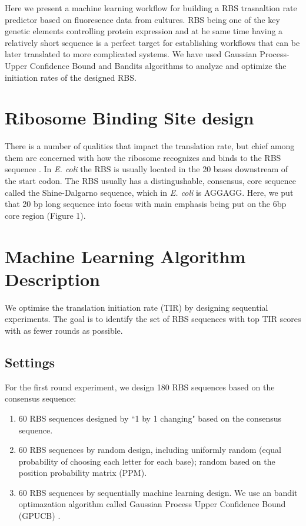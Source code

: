\documentclass{article}
\begin{document}
Here we present a machine learning workflow for building a RBS trasnaltion rate predictor based on fluoresence data from cultures. RBS being one of the key genetic elements controlling protein expression and at he same time having a relatively short sequence is a perfect target for establishing workflows that can be later translated to more complicated systems. We have used Gaussian Process-Upper Confidence Bound and Bandits algorithms to analyze and optimize the initiation rates of the designed RBS.

\section{Ribosome Binding Site design}
There is a number of qualities that impact the translation rate, but chief among them are concerned with how the ribosome recognizes and binds to the RBS sequence \cite{Chen1994,Vellanoweth1992}. In \emph{E. coli} the RBS is usually located in the 20 bases downstream of the start codon. The RBS usually has a distingushable, consensus, core sequence called the Shine-Dalgarno sequence, which in \emph{E. coli} is AGGAGG. Here, we put that 20 bp long sequence into focus with main emphasis being put on the 6bp core region (Figure 1). \\


\section{Machine Learning Algorithm Description}

We optimise the translation initiation rate (TIR) by designing sequential experiments. The goal is to identify the set of RBS sequences with top TIR scores with as fewer rounds as possible. 

\subsection{Settings}

For the first round experiment, we design 180 RBS sequences based on the consensus sequence: 

\begin{enumerate}
    \item 60 RBS sequences designed by ``1 by 1 changing" based on the consensus sequence.
    \item 60 RBS sequences by random design, including uniformly random (equal probability of choosing each letter for each base); random based on the position probability matrix (PPM).
    \item 60 RBS sequences by sequentially machine learning design. We use an bandit optimazation algorithm called Gaussian Process Upper Confidence Bound (GPUCB) \cite{srinivas2012information}.   
\end{enumerate}{}
\end{document}
